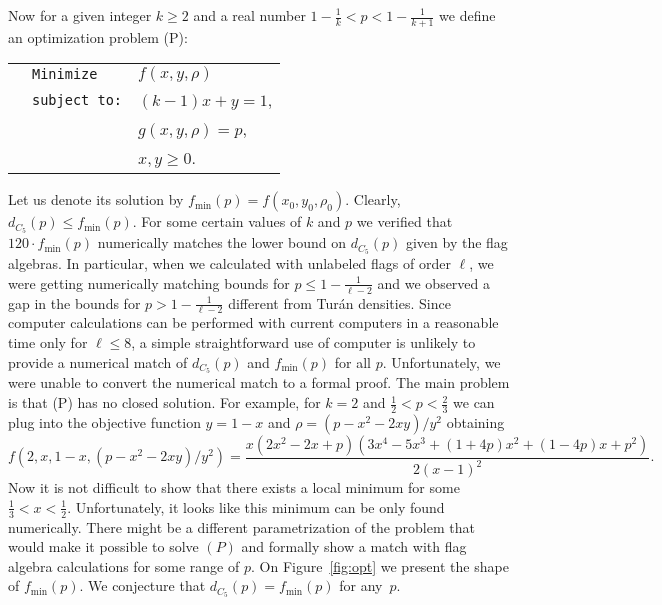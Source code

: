 \documentclass[12pt]{article}
\theoremstyle{definition}
\theoremstyle{remark}
\renewcommand{\ge}{\geqslant}
\renewcommand{\leq}{\leqslant}
\renewcommand{\le}{\leqslant}
\begin{document}
Now for a given integer $k\ge 2$ and a real number $1-\frac1k < p < 1-\frac1{k+1}$ we define an optimization problem (P):
\begin{center}
\begin{tabular}{l l l}
& \texttt{Minimize}    & $f(x, y, \rho)$ \\[8pt]
     & \texttt{subject to:} & $(k-1)x+y = 1$,\\[5pt]
     & & $g(x, y, \rho) = p$,\\[5pt]
     & & $x,y\ge 0$.\\[5pt]
\end{tabular}
\end{center}
Let us denote its solution by $f_{\min}(p) = f(x_0, y_0, \rho_0)$. Clearly, $d_{C_5}(p) \le f_{\min}(p)$. For some certain values of $k$ and $p$ 
we verified that $120\cdot f_{\min}(p)$ numerically matches 
%
the lower bound on $d_{C_5}(p)$ given by the flag algebras.
In particular, when we calculated with unlabeled flags of order $\ell$, we were getting numerically matching 
bounds for $p \leq 1 - \frac{1}{\ell-2}$ and we observed a gap in the bounds for $p > 1 - \frac{1}{\ell-2}$ different from Tur\'an densities.
Since computer calculations can be performed with current computers in a reasonable time only for $\ell \leq 8$, a simple straightforward use of computer is unlikely to provide a numerical match of $d_{C_5}(p)$ and $f_{\min}(p)$ for all $p$.
Unfortunately, we were unable to convert the numerical match to a formal proof.
%
The main problem is that (P) has no closed solution. For example, for $k=2$ and $\frac{1}{2}< p < \frac{2}{3}$ we can plug into the objective function $y=1-x$ and $\rho = (p - x^2 - 2xy)/y^2$ obtaining
\[
f(2, x, 1-x, (p - x^2 - 2xy)/y^2) = {\frac { x ( 2x^{2}-2x+p)  ( 3x^{4}-5x^{3} +(1+4p)x^{2}+ (1-4p)x+p^2) }{2 \left(x-1
 \right) ^{2}}}.
\]
Now it is not difficult to show that there exists a local minimum for some $\frac{1}{3} < x < \frac{1}{2}$. Unfortunately, it looks like this minimum can be only found numerically.
There might be a different parametrization of the problem that would make it possible to solve $(P)$ and formally show  a match with flag algebra calculations for some range of $p$.
On Figure~\ref{fig:opt} we present the shape of $f_{\min}(p)$. We conjecture that $d_{C_5}(p) = f_{\min}(p)$ for any~$p$.
\end{document}
